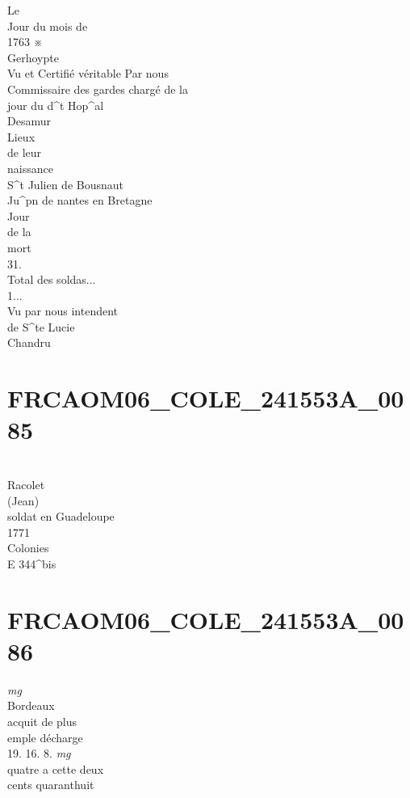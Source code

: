 \documentclass{article}
\begin{document}
\begin{pages}
Le\\
Jour du mois de\\
1763 ※\\
Gerhoypte\\
Vu et Certifié véritable Par nous\\
Commissaire des gardes chargé de la\\
jour du d\^{}t Hop\^{}al\\
Desamur
\pend\pstart
\\
Lieux\\
de leur\\
naissance\\
S\^{}t Julien de Bousnaut\\
Ju\^{}pn de nantes en Bretagne
\pend\pstart
\\
Jour\\
de la\\
mort\\
31.
\pend\pstart
\\
Total des soldas...\\
1...
\pend\pstart
\\
Vu par nous intendent\\
de S\^{}te Lucie\\
Chandru
\pend
\endnumbering\beginnumbering\section{FRCAOM06\_COLE\_241553A\_0085}\pstart
\\
Racolet\\
(Jean)\\
soldat en Guadeloupe\\
1771\\
Colonies\\
E 344\^{}bis
\pend
\endnumbering\beginnumbering\section{FRCAOM06\_COLE\_241553A\_0086}
\vspace{0.5cm}\noindent
\textit{mg}
\footnotesize \\
Bordeaux\\
acquit de plus\\
emple décharge\\
19. 16. 8.
\normalsize 
\vspace{0.5cm}\noindent
\textit{mg}
\footnotesize \\
quatre a cette deux\\
cents quaranthuit
\normalsize \pstart
\\

\end{pages}
\end{document}
